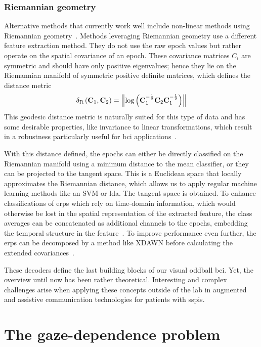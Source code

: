 \subsubsection{Riemannian geometry}

Alternative methods that currently work well include non-linear methods using Riemannian
geometry~\cite{Barachant2014}.
Methods leveraging Riemannian geometry use a different feature extraction method.
They do not use the raw epoch values but rather operate on the spatial covariance of an
epoch.
These covariance matrices $C_i$ are symmetric and should have only positive eigenvalues;
hence they lie on the Riemannian manifold of symmetric positive definite matrices, which
defines the distance metric
\begin{equation}
  \delta_\text{R}\left(\mathbf{C}_1,\mathbf{C}_2\right)
  =\left\lVert\log\left(\mathbf{C}_1^{-\frac{1}{2}} \mathbf{C}_2 \mathbf{C}_1^{-\frac{1}{2}}\right)\right\rVert
\end{equation}
This geodesic distance metric is naturally suited for this type of data and has some
desirable properties, like invariance to linear transformations, which result in a
robustness particularly useful for \ac{bci} applications~\cite{Barachant2011}.

With this distance defined, the epochs can either be directly classified on the
Riemannian manifold using a minimum distance to the mean classifier, or they can be
projected to the tangent space.
This is a Euclidean space that locally approximates the Riemannian distance, which
allows us to apply regular machine learning methods like an SVM or \ac{lda}.
The tangent space is obtained.
To enhance classifications of \acp{erp} which rely on time-domain information, which
would otherwise be lost in the spatial representation of the extracted feature, the
class averages can be concatenated as additional channels to the epochs, embedding the
temporal structure in the feature~\cite{Barachant2014}.
To improve performance even further, the \acp{erp} can be decomposed by a method like
XDAWN before calculating the extended covariances~\cite{Li2020}.

These decoders define the last building blocks of our visual oddball \ac{bci}.
Yet, the overview until now has been rather theoretical.
Interesting and complex challenges arise when applying these concepts outside of the lab
in augmented and assistive communication technologies for patients with \acp{sspi}.

\section{The gaze-dependence problem}

